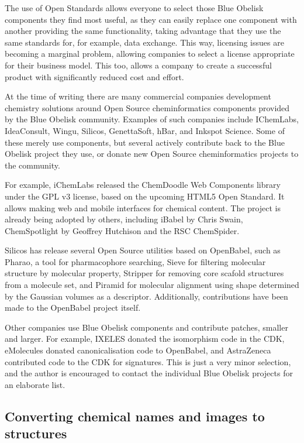 \documentclass[10pt]{bmc_article}
\newenvironment{bmcformat}{\fussy\setboolean{publ}{true}}{\fussy}
\begin{document}
\begin{bmcformat}
The use of Open Standards allows everyone to select those Blue Obelisk components
they find most useful, as they can easily replace one component with another providing
the same functionality, taking advantage that they use the same standards for,
for example, data exchange. This way, licensing issues are becoming a marginal
problem, allowing companies to select a license appropriate for their business
model. This too, allows a company to create a successful product with significantly
reduced cost and effort.

At the time of writing there are many commercial companies development chemistry
solutions around Open Source cheminformatics components provided by the Blue Obelisk
community. Examples of such companies include IChemLabs, IdeaConsult, Wingu, Silicos,
GenettaSoft, hBar, and Inkspot Science. Some of these merely use components, but several
actively contribute back to the Blue Obelisk project they use, or donate new
Open Source cheminformatics projects to the community.

For example, iChemLabs released the ChemDoodle Web Components library under the GPL v3
license, based on the upcoming HTML5 Open Standard. It allows making web and mobile
interfaces for chemical content. The project is already being adopted by others,
including iBabel by Chris Swain\cite{iBabel}, ChemSpotlight by
Geoffrey Hutchison\cite{chemspotlight} and the RSC ChemSpider\cite{chemspider_chemdoodle}.

Silicos has release several Open Source utilities based on
OpenBabel, such as Pharao, a tool for pharmacophore searching,
Sieve for filtering molecular structure by molecular property,
Stripper for removing core scafold structures from a molecule
set, and Piramid for molecular alignment using shape determined
by the Gaussian volumes as a descriptor. Additionally,
contributions have been made to the OpenBabel project itself.

Other companies use Blue Obelisk components and contribute patches,
smaller and larger. For example, IXELES donated the isomorphism
code in the CDK, eMolecules donated canonicalisation code to
OpenBabel, and AstraZeneca contributed code to the CDK for
signatures. This is just a very minor selection, and the author
is encouraged to contact the individual Blue Obelisk projects
for an elaborate list.

\subsection*{Converting chemical names and images to structures}


\end{bmcformat}
\end{document}
